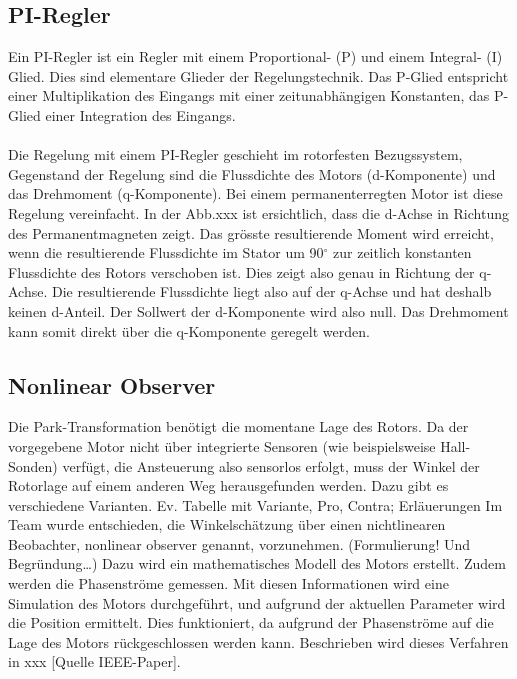 \subsection*{PI-Regler}
Ein PI-Regler ist ein Regler mit einem Proportional- (P) und einem Integral- (I) Glied. Dies sind elementare Glieder der Regelungstechnik. Das P-Glied entspricht einer Multiplikation des Eingangs mit einer zeitunabhängigen Konstanten, das P-Glied einer Integration des Eingangs. 
\\\\
Die Regelung mit einem PI-Regler geschieht im rotorfesten Bezugssystem, Gegenstand der Regelung sind die Flussdichte des Motors (d-Komponente) und das Drehmoment (q-Komponente). Bei einem permanenterregten Motor ist diese Regelung vereinfacht. In der Abb.xxx ist ersichtlich, dass die d-Achse in Richtung des Permanentmagneten zeigt. Das grösste resultierende Moment wird erreicht, wenn die resultierende Flussdichte im Stator um 90\(^\circ\) zur zeitlich konstanten Flussdichte des Rotors verschoben ist. Dies zeigt also genau in Richtung der q-Achse. Die resultierende Flussdichte liegt also auf der q-Achse und hat deshalb keinen d-Anteil. Der Sollwert der d-Komponente wird also null. Das Drehmoment kann somit direkt über die q-Komponente geregelt werden. 





\subsection*{Nonlinear Observer}
Die Park-Transformation benötigt die momentane Lage des Rotors. Da der vorgegebene Motor nicht über integrierte Sensoren (wie beispielsweise Hall-Sonden) verfügt, die Ansteuerung also sensorlos erfolgt, muss der Winkel der Rotorlage auf einem anderen Weg herausgefunden werden. Dazu gibt es verschiedene Varianten. 
Ev. Tabelle mit Variante, Pro, Contra; Erläuerungen 
Im Team wurde entschieden, die Winkelschätzung über einen nichtlinearen Beobachter, nonlinear observer genannt, vorzunehmen. (Formulierung! Und Begründung…) Dazu wird ein mathematisches Modell des Motors erstellt. Zudem werden die Phasenströme gemessen. Mit diesen Informationen wird eine Simulation des Motors durchgeführt, und aufgrund der aktuellen Parameter wird die Position ermittelt. Dies funktioniert, da aufgrund der Phasenströme auf die Lage des Motors rückgeschlossen werden kann. Beschrieben wird dieses Verfahren in xxx [Quelle IEEE-Paper].


